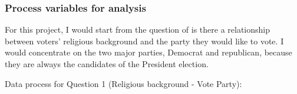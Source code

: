 \documentclass[
]{article}
\newenvironment{Shaded}{\begin{snugshade}}{\end{snugshade}}
\newcommand{\DataTypeTok}[1]{\textcolor[rgb]{0.13,0.29,0.53}{#1}}
\newcommand{\DecValTok}[1]{\textcolor[rgb]{0.00,0.00,0.81}{#1}}
\newcommand{\KeywordTok}[1]{\textcolor[rgb]{0.13,0.29,0.53}{\textbf{#1}}}
\newcommand{\NormalTok}[1]{#1}
\newcommand{\OperatorTok}[1]{\textcolor[rgb]{0.81,0.36,0.00}{\textbf{#1}}}
\newcommand{\StringTok}[1]{\textcolor[rgb]{0.31,0.60,0.02}{#1}}
\begin{document}
\hypertarget{process-variables-for-analysis}{%
\subsubsection{Process variables for
analysis}\label{process-variables-for-analysis}}

For this project, I would start from the question of is there a
relationship between voters' religious background and the party they
would like to vote. I would concentrate on the two major parties,
Democrat and republican, because they are always the candidates of the
President election.

Data process for Question 1 (Religious background - Vote Party):

\begin{Shaded}
\end{Shaded}
\end{document}
